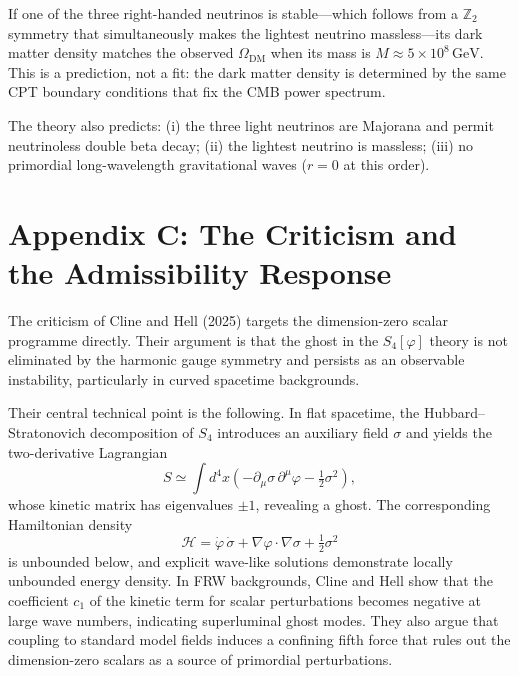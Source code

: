 \documentclass[12pt,a4paper]{article}
\theoremstyle{remark}
\begin{document}
If one of the three right-handed neutrinos is stable---which follows from a $\mathbb{Z}_2$
symmetry that simultaneously makes the lightest neutrino massless---its dark matter density
matches the observed $\Omega_{\mathrm{DM}}$ when its mass is $M \approx 5 \times 10^8\,\mathrm{GeV}$.
This is a prediction, not a fit: the dark matter density is determined by the same CPT boundary
conditions that fix the CMB power spectrum.

The theory also predicts: (i) the three light neutrinos are Majorana and permit neutrinoless
double beta decay; (ii) the lightest neutrino is massless; (iii) no primordial long-wavelength
gravitational waves ($r = 0$ at this order).


\section*{Appendix C: The Criticism and the Admissibility Response}

The criticism of Cline and Hell (2025) targets the dimension-zero scalar programme directly.
Their argument is that the ghost in the $S_4[\varphi]$ theory is not eliminated by the harmonic
gauge symmetry and persists as an observable instability, particularly in curved spacetime
backgrounds.

Their central technical point is the following. In flat spacetime, the Hubbard--Stratonovich
decomposition of $S_4$ introduces an auxiliary field $\sigma$ and yields the two-derivative
Lagrangian
\begin{equation}
  S \simeq \int d^4x\!\left(-\partial_\mu\sigma\,\partial^\mu\varphi - \tfrac{1}{2}\sigma^2\right),
\end{equation}
whose kinetic matrix has eigenvalues $\pm 1$, revealing a ghost. The corresponding Hamiltonian
density
\begin{equation}
  \mathcal{H} = \dot\varphi\,\dot\sigma + \nabla\varphi\cdot\nabla\sigma + \tfrac{1}{2}\sigma^2
\end{equation}
is unbounded below, and explicit wave-like solutions demonstrate locally unbounded energy density.
In FRW backgrounds, Cline and Hell show that the coefficient $c_1$ of the kinetic term for
scalar perturbations becomes negative at large wave numbers, indicating superluminal ghost modes.
They also argue that coupling to standard model fields induces a confining fifth force that rules
out the dimension-zero scalars as a source of primordial perturbations.
\end{document}

